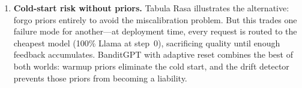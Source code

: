 \begin{enumerate}[leftmargin=*,noitemsep]
  \item \textbf{Cold-start risk without priors.}
        Tabula Rasa illustrates the alternative: forgo priors entirely
        to avoid the miscalibration problem.  But this trades one
        failure mode for another---at deployment time, every request
        is routed to the cheapest model (100\% Llama at step~0),
        sacrificing quality until enough feedback accumulates.
        BanditGPT with adaptive reset combines the best of both
        worlds: warmup priors eliminate the cold start, and the drift
        detector prevents those priors from becoming a liability.
\end{enumerate}
